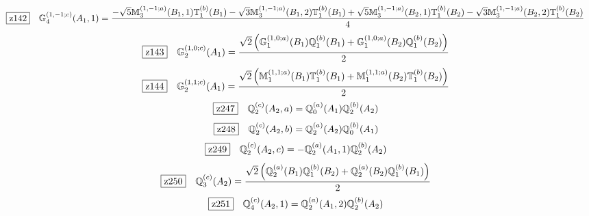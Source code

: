 \documentclass[fleqn,10pt,landscape]{jsarticle}
\begin{document}
\begin{dmath*}
\hspace*{3mm}\fbox{z142}\quad \mathbb{G}_{4}^{(1,-1;c)}(A_{1},1)=\frac{- \sqrt{5} \mathbb{M}_{3}^{(1,-1;a)}(B_{1},1) \mathbb{T}_{1}^{(b)}(B_{1}) - \sqrt{3} \mathbb{M}_{3}^{(1,-1;a)}(B_{1},2) \mathbb{T}_{1}^{(b)}(B_{1}) + \sqrt{5} \mathbb{M}_{3}^{(1,-1;a)}(B_{2},1) \mathbb{T}_{1}^{(b)}(B_{2}) - \sqrt{3} \mathbb{M}_{3}^{(1,-1;a)}(B_{2},2) \mathbb{T}_{1}^{(b)}(B_{2})}{4}
\end{dmath*}
\begin{dmath*}
\hspace*{3mm}\fbox{z143}\quad \mathbb{G}_{2}^{(1,0;c)}(A_{1})=\frac{\sqrt{2} \left(\mathbb{G}_{1}^{(1,0;a)}(B_{1}) \mathbb{Q}_{1}^{(b)}(B_{1}) + \mathbb{G}_{1}^{(1,0;a)}(B_{2}) \mathbb{Q}_{1}^{(b)}(B_{2})\right)}{2}
\end{dmath*}
\begin{dmath*}
\hspace*{3mm}\fbox{z144}\quad \mathbb{G}_{2}^{(1,1;c)}(A_{1})=\frac{\sqrt{2} \left(\mathbb{M}_{1}^{(1,1;a)}(B_{1}) \mathbb{T}_{1}^{(b)}(B_{1}) + \mathbb{M}_{1}^{(1,1;a)}(B_{2}) \mathbb{T}_{1}^{(b)}(B_{2})\right)}{2}
\end{dmath*}
\begin{dmath*}
\hspace*{3mm}\fbox{z247}\quad \mathbb{Q}_{2}^{(c)}(A_{2},a)=\mathbb{Q}_{0}^{(a)}(A_{1}) \mathbb{Q}_{2}^{(b)}(A_{2})
\end{dmath*}
\begin{dmath*}
\hspace*{3mm}\fbox{z248}\quad \mathbb{Q}_{2}^{(c)}(A_{2},b)=\mathbb{Q}_{2}^{(a)}(A_{2}) \mathbb{Q}_{0}^{(b)}(A_{1})
\end{dmath*}
\begin{dmath*}
\hspace*{3mm}\fbox{z249}\quad \mathbb{Q}_{2}^{(c)}(A_{2},c)=- \mathbb{Q}_{2}^{(a)}(A_{1},1) \mathbb{Q}_{2}^{(b)}(A_{2})
\end{dmath*}
\begin{dmath*}
\hspace*{3mm}\fbox{z250}\quad \mathbb{Q}_{3}^{(c)}(A_{2})=\frac{\sqrt{2} \left(\mathbb{Q}_{2}^{(a)}(B_{1}) \mathbb{Q}_{1}^{(b)}(B_{2}) + \mathbb{Q}_{2}^{(a)}(B_{2}) \mathbb{Q}_{1}^{(b)}(B_{1})\right)}{2}
\end{dmath*}
\begin{dmath*}
\hspace*{3mm}\fbox{z251}\quad \mathbb{Q}_{4}^{(c)}(A_{2},1)=\mathbb{Q}_{2}^{(a)}(A_{1},2) \mathbb{Q}_{2}^{(b)}(A_{2})
\end{dmath*}
\end{document}

